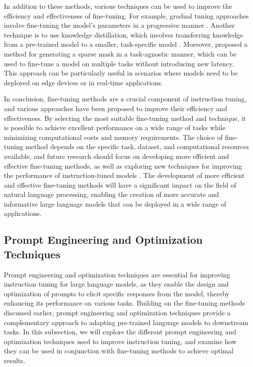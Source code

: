 \documentclass[11pt]{article}
\begin{document}
In addition to these methods, various techniques can be used to improve the efficiency and effectiveness of fine-tuning. For example, gradual tuning approaches involve fine-tuning the model's parameters in a progressive manner \cite{ref58}. Another technique is to use knowledge distillation, which involves transferring knowledge from a pre-trained model to a smaller, task-specific model \cite{ref59}. Moreover, \cite{ref60} proposed a method for generating a sparse mask in a task-agnostic manner, which can be used to fine-tune a model on multiple tasks without introducing new latency. This approach can be particularly useful in scenarios where models need to be deployed on edge devices or in real-time applications.

In conclusion, fine-tuning methods are a crucial component of instruction tuning, and various approaches have been proposed to improve their efficiency and effectiveness. By selecting the most suitable fine-tuning method and technique, it is possible to achieve excellent performance on a wide range of tasks while minimizing computational costs and memory requirements. The choice of fine-tuning method depends on the specific task, dataset, and computational resources available, and future research should focus on developing more efficient and effective fine-tuning methods, as well as exploring new techniques for improving the performance of instruction-tuned models \cite{ref61}. The development of more efficient and effective fine-tuning methods will have a significant impact on the field of natural language processing, enabling the creation of more accurate and informative large language models that can be deployed in a wide range of applications.

\subsection{Prompt Engineering and Optimization Techniques}

Prompt engineering and optimization techniques are essential for improving instruction tuning for large language models, as they enable the design and optimization of prompts to elicit specific responses from the model, thereby enhancing its performance on various tasks. Building on the fine-tuning methods discussed earlier, prompt engineering and optimization techniques provide a complementary approach to adapting pre-trained language models to downstream tasks. In this subsection, we will explore the different prompt engineering and optimization techniques used to improve instruction tuning, and examine how they can be used in conjunction with fine-tuning methods to achieve optimal results.
\end{document}
